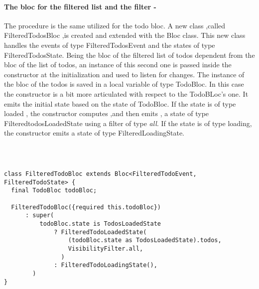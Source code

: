 \paragraph{The bloc for the filtered list and the filter - }
\label{subpar:todo_app_bloc_core_state}
The procedure is the same utilized for the todo bloc. A new class ,called FilteredTodosBloc ,is created and extended with the Bloc class. This new class handles the events of type FilteredTodosEvent and the states of type FilteredTodosState. Being the bloc of the filtered list of todos dependent from the bloc of the list of todos, an instance of this second one is passed inside the constructor at the initialization and used to listen for changes.
The instance of the bloc of the todos is saved in a local variable of type TodoBloc. In this case the constructor is a bit more articulated with respect to the TodoBLoc's one. It emits the initial state based on the state of TodoBloc. If the state is of type loaded , the constructor computes ,and then emits , a state of type FilteredtodosLoadedState using a filter of type \textit{all}. If the state is of type loading, the constructor emits a state of type FilteredLoadingState.
\begin{code}
\mbox{}\\
 \mbox{}
\label{code:2.14}
\begin{verbatim}

class FilteredTodoBloc extends Bloc<FilteredTodoEvent, FilteredTodoState> {
  final TodoBloc todoBloc;

  FilteredTodoBloc({required this.todoBloc})
      : super(
          todoBloc.state is TodosLoadedState
              ? FilteredTodoLoadedState(
                  (todoBloc.state as TodosLoadedState).todos,
                  VisibilityFilter.all,
                )
              : FilteredTodoLoadingState(),
        )  
}
\end{verbatim}
\mbox{}
\end{code}

